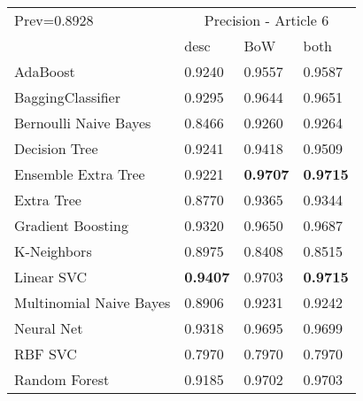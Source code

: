 \begin{tabular}{|l|l|l|l| }
\hline
Prev=0.8928 &  \multicolumn{3}{c|}{Precision - Article 6} \\
\cline{2-4} & desc & BoW & both \\ \hline
AdaBoost                & 0.9240 & 0.9557 & 0.9587\\
BaggingClassifier       & 0.9295 & 0.9644 & 0.9651\\
Bernoulli Naive Bayes   & 0.8466 & 0.9260 & 0.9264\\
Decision Tree           & 0.9241 & 0.9418 & 0.9509\\
Ensemble Extra Tree     & 0.9221 & {\bf 0.9707} & {\bf 0.9715}\\
Extra Tree              & 0.8770 & 0.9365 & 0.9344\\
Gradient Boosting       & 0.9320 & 0.9650 & 0.9687\\
K-Neighbors             & 0.8975 & 0.8408 & 0.8515\\
Linear SVC              & {\bf 0.9407} & 0.9703 & {\bf 0.9715}\\
Multinomial Naive Bayes & 0.8906 & 0.9231 & 0.9242\\
Neural Net              & 0.9318 & 0.9695 & 0.9699\\
RBF SVC                 & 0.7970 & 0.7970 & 0.7970\\
Random Forest           & 0.9185 & 0.9702 & 0.9703\\
\hline
\end{tabular}
